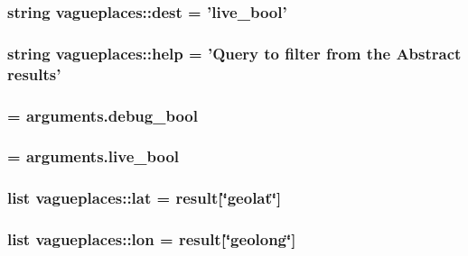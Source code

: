 \hypertarget{namespacevagueplaces_aacfed2e477d0a97080d7d50fb875619e}{
\subsubsection[{dest}]{\setlength{\rightskip}{0pt plus 5cm}string {\bf vagueplaces\-::dest} = 'live\-\_\-bool'}}\label{namespacevagueplaces_aacfed2e477d0a97080d7d50fb875619e}
\hypertarget{namespacevagueplaces_a23c662171941a2348ade72200850b133}{
\subsubsection[{help}]{\setlength{\rightskip}{0pt plus 5cm}string {\bf vagueplaces\-::help} = '\-Query to filter from the \-Abstract results'}}\label{namespacevagueplaces_a23c662171941a2348ade72200850b133}
\hypertarget{namespacevagueplaces_a4dcc7b9604e1fd16000c4f36becf8697}{
\subsubsection[{isdebug}]{ = arguments.\-debug\-\_\-bool}}\label{namespacevagueplaces_a4dcc7b9604e1fd16000c4f36becf8697}
\hypertarget{namespacevagueplaces_ae377bfacd073c19ab35ff25f123eab1a}{
\subsubsection[{islive}]{ = arguments.\-live\-\_\-bool}}\label{namespacevagueplaces_ae377bfacd073c19ab35ff25f123eab1a}
\hypertarget{namespacevagueplaces_affe00f0ec5293de098491e2ee7a27bbf}{
\subsubsection[{lat}]{\setlength{\rightskip}{0pt plus 5cm}list {\bf vagueplaces\-::lat} = result\mbox{[}\char`\"{}geolat\char`\"{}\mbox{]}}}\label{namespacevagueplaces_affe00f0ec5293de098491e2ee7a27bbf}
\hypertarget{namespacevagueplaces_a95b2086442c1258ddf336e75265f6885}{
\subsubsection[{lon}]{\setlength{\rightskip}{0pt plus 5cm}list {\bf vagueplaces\-::lon} = result\mbox{[}\char`\"{}geolong\char`\"{}\mbox{]}}}\label{namespacevagueplaces_a95b2086442c1258ddf336e75265f6885}
